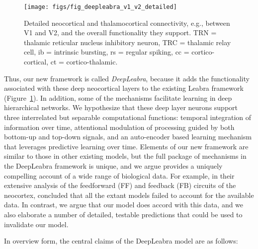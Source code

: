 \documentclass[11pt,twoside]{article}
\newif\myifpdf
\begin{document}
\begin{figure}
  \centering\texttt{[image: figs/fig\_deepleabra\_v1\_v2\_detailed]}
  \caption{\small Detailed neocortical and thalamocortical connectivity, e.g., between V1 and V2, and the overall functionality they support. TRN = thalamic reticular nucleus inhibitory neuron, TRC = thalamic relay cell, ib = intrinsic bursting, rs = regular spiking, cc = cortico-cortical, ct = cortico-thalamic.}
  \label{fig.deepleabra}
\end{figure}

Thus, our new framework is called {\em DeepLeabra}, because it adds the functionality associated with these deep neocortical layers to the existing Leabra framework (Figure~\ref{fig.deepleabra}).  In addition, some of the mechanisms facilitate learning in deep hierarchical networks.  We hypothesize that these deep layer neurons support three interrelated but separable computational functions: temporal integration of information over time, attentional modulation of processing guided by both bottom-up and top-down signals, and an auto-encoder based learning mechanism that leverages predictive learning over time.  Elements of our new framework are similar to those in other existing models, but the full package of mechanisms in the DeepLeabra framework is unique, and we argue provides a uniquely compelling account of a wide range of biological data.  For example, in their extensive analysis of the feedforward (FF) and feedback (FB) circuits of the neocortex,  concluded that all the extant models failed to account for the available data.  In contrast, we argue that our model does accord with this data, and we also elaborate a number of detailed, testable predictions that could be used to invalidate our model.

In overview form, the central claims of the DeepLeabra model are as follows:
\end{document}

